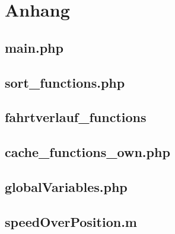 \section{Anhang}

\subsection{main.php} \label{anhangMain}



\subsection{sort\_functions.php} \label{sortFunctions}



\subsection{fahrtverlauf\_functions} \label{fahrtverlaufFunctions}



\subsection{cache\_functions\_own.php} \label{cacheFunctionsOwn}



\subsection{globalVariables.php} \label{anhangGlobalVariables}



\subsection{speedOverPosition.m} \label{anhangMatlab}


